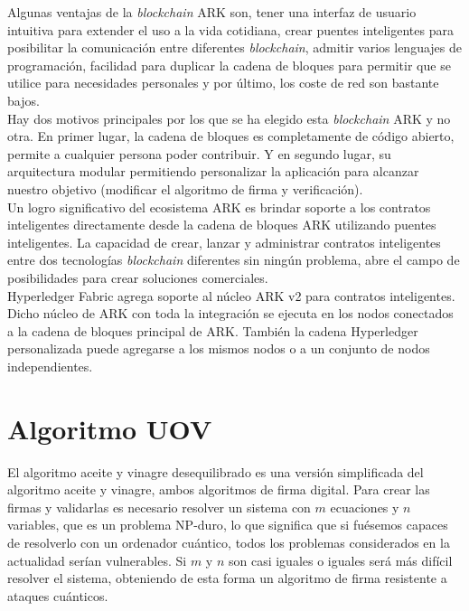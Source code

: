 Algunas ventajas de la \textit{blockchain} ARK son, tener una interfaz de usuario intuitiva para extender el uso a la vida cotidiana, crear puentes inteligentes para posibilitar la comunicación entre diferentes \textit{blockchain}, admitir varios lenguajes de programación, facilidad para duplicar la cadena de bloques para permitir que se utilice para necesidades personales y por último, los coste de red son bastante bajos\cite{ark-pros}.\\

Hay dos motivos principales por los que se ha elegido esta \textit{blockchain} ARK y no otra. En primer lugar, la cadena de bloques es completamente de código abierto, permite a cualquier persona poder contribuir. Y en segundo lugar, su arquitectura modular permitiendo personalizar la aplicación para alcanzar nuestro objetivo (modificar el algoritmo de firma y verificación).\\


Un logro significativo del ecosistema ARK es brindar soporte a los contratos inteligentes directamente desde la cadena de bloques ARK utilizando puentes inteligentes. La capacidad de crear, lanzar y administrar contratos inteligentes entre dos tecnologías \textit{blockchain} diferentes sin ningún problema, abre el campo de posibilidades para crear soluciones comerciales.\\

Hyperledger Fabric agrega soporte al núcleo ARK v2 para contratos inteligentes. Dicho núcleo de ARK con toda la integración se ejecuta en los nodos conectados a la cadena de bloques principal de ARK. También la cadena Hyperledger personalizada puede agregarse a los mismos nodos o a un conjunto de nodos independientes\cite{hyperledger-ark}.\\



\section{Algoritmo UOV}\label{sec:intro:UOV}

El algoritmo aceite y vinagre desequilibrado\cite{algoritmo-UOV} es una versión simplificada del algoritmo aceite y vinagre, ambos algoritmos de firma digital. Para crear las firmas y validarlas es necesario resolver un sistema con $m$ ecuaciones y $n$ variables, que es un problema NP-duro\cite{UOV-def}, lo que significa que si fuésemos capaces de resolverlo con un ordenador cuántico, todos los problemas considerados en la actualidad serían vulnerables. Si $m$ y $n$ son casi iguales o iguales será más difícil resolver el sistema, obteniendo de esta forma un algoritmo de firma resistente a ataques cuánticos.\\

